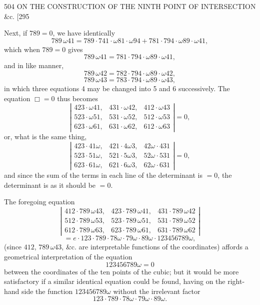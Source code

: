 \documentclass[11pt]{article}
\begin{document}
\begin{center}
504 \hfill ON THE CONSTRUCTION OF THE NINTH POINT OF INTERSECTION \&c. \hfill [295
\end{center}

Next, if $789=0$, we have identically
\[ 789\,\omega 41 = 789\cdot 741\cdot \omega 81\cdot \omega 94 + 781\cdot 794\cdot \omega 89\cdot \omega 41, \]
which when $789=0$ gives
\[ 789\,\omega 41 = 781\cdot 794\cdot \omega 89\cdot \omega 41, \]
and in like manner,
\[ 789\,\omega 42 = 782\cdot 794\cdot \omega 89\cdot \omega 42, \]
\[ 789\,\omega 43 = 783\cdot 794\cdot \omega 89\cdot \omega 43, \]
in which three equations 4 may be changed into 5 and 6 successively. The equation $\Box = 0$ thus becomes
\[ \left| \begin{array}{ccc} 423\cdot \omega 41, & 431\cdot \omega 42, & 412\cdot \omega 43 \\ 523\cdot \omega 51, & 531\cdot \omega 52, & 512\cdot \omega 53 \\ 623\cdot \omega 61, & 631\cdot \omega 62, & 612\cdot \omega 63 \end{array} \right| = 0, \]
or, what is the same thing,
\[ \left| \begin{array}{ccc} 423\cdot 41\omega, & 421\cdot 4\omega 3, & 42\omega\cdot 431 \\ 523\cdot 51\omega, & 521\cdot 5\omega 3, & 52\omega\cdot 531 \\ 623\cdot 61\omega, & 621\cdot 6\omega 3, & 62\omega\cdot 631 \end{array} \right| = 0, \]
and since the sum of the terms in each line of the determinant is $=0$, the determinant is as it should be $=0$.

The foregoing equation
\[ \left| \begin{array}{ccc} 412\cdot 789\,\omega 43, & 423\cdot 789\,\omega 41, & 431\cdot 789\,\omega 42 \\ 512\cdot 789\,\omega 53, & 523\cdot 789\,\omega 51, & 531\cdot 789\,\omega 52 \\ 612\cdot 789\,\omega 63, & 623\cdot 789\,\omega 61, & 631\cdot 789\,\omega 62 \end{array} \right| \]
\[ = e \cdot 123\cdot 789\cdot 78\omega\cdot 79\omega\cdot 89\omega\cdot 123456789\omega, \]
(since $412$, $789\,\omega 43$, \&c. are interpretable functions of the coordinates) affords a geometrical interpretation of the equation
\[ 123456789\omega = 0 \]
between the coordinates of the ten points of the cubic; but it would be more satisfactory if a similar identical equation could be found, having on the right-hand side the function $123456789\omega$ without the irrelevant factor
\[ 123\cdot 789\cdot 78\omega\cdot 79\omega\cdot 89\omega. \]
\end{document}
